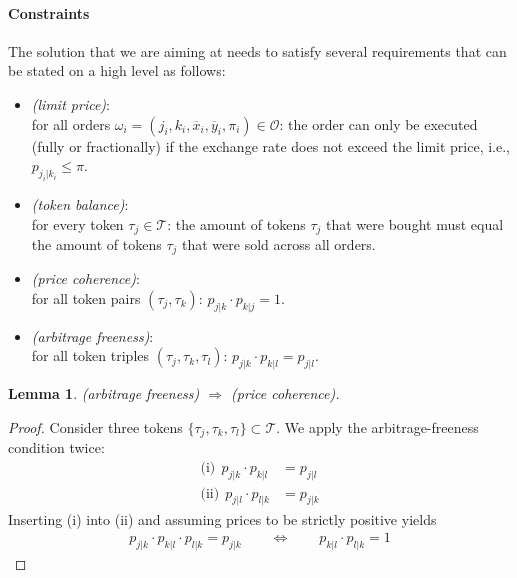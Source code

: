 \documentclass[11pt,parskip=full]{scrartcl}%
\newcommand*{\ie}{i.e., }
\newcommand*{\tokens}{\mathcal{T}}          %
\newcommand*{\orders}{\mathcal{O}}          %
\newtheorem{lemma}[theorem]{Lemma}
\begin{document}
\paragraph{Constraints}

The solution that we are aiming at needs to satisfy several requirements that can be stated on a
high level as follows:
\begin{itemize}
  \item \emph{(limit price)}:\\
  for all orders
  $ \omega_i = (j_i,k_i,\overline{x}_i,\overline{y}_i,\pi_i) \in \orders $:
  the order can only be executed (fully or fractionally) if the exchange rate does not exceed the
  limit price, \ie $ p_{j_i|k_i} \le \pi $.
  \item \emph{(token balance)}:\\
  for every token $ \tau_j \in \tokens $: the amount of tokens $ \tau_j $ that were bought must
  equal the amount of tokens $ \tau_j $ that were sold across all orders.
  \item \emph{(price coherence)}:\\
  for all token pairs $ (\tau_j,\tau_k) $: $ p_{j|k} \cdot p_{k|j} = 1 $.
  \item \emph{(arbitrage freeness)}:\\
  for all token triples $ (\tau_j,\tau_k,\tau_l) $: $ p_{j|k} \cdot p_{k|l} = p_{j|l} $.
\end{itemize}

\newpage
\begin{lemma}
  (arbitrage freeness) $ \Rightarrow $ (price coherence).
\end{lemma}
\vspace{-.8cm}
\begin{proof}
  Consider three tokens $ \{\tau_j,\tau_k,\tau_l\} \subset \tokens $.
  We apply the arbitrage-freeness condition twice:
  \begin{align*}
    \text{(i)}  \>\> p_{j|k} \cdot p_{k|l} &= p_{j|l} \\
    \text{(ii)} \>\> p_{j|l} \cdot p_{l|k} &= p_{j|k}
  \end{align*}
  Inserting (i) into (ii) and assuming prices to be strictly positive yields
  \begin{align*}
    p_{j|k} \cdot p_{k|l} \cdot p_{l|k} = p_{j|k}
    \qquad \Leftrightarrow \qquad
    p_{k|l} \cdot p_{l|k} = 1
  \end{align*}
\end{proof}
\vspace{-.4cm}
\end{document}
